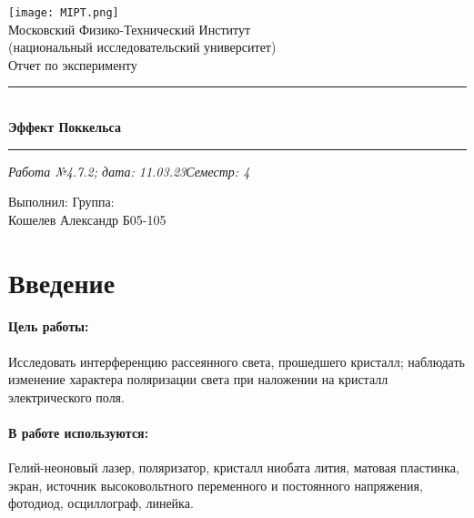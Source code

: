 \documentclass[12pt,a4paper]{article}
\begin{document}
	\begin{titlepage}
		\vspace*{\fill}
		
		\begin{center}
			\texttt{[image: MIPT.png]}
			\\[0.7cm]\Huge Московский Физико-Технический Институт\\(национальный исследовательский университет)
			\\[2cm]\LARGE Отчет по эксперименту
			\\[0.5cm]\noindent\rule{\textwidth}{1pt}
			\\\Huge\textbf{Эффект Поккельса}
			\\[-0.5cm]\noindent\rule{\textwidth}{1pt}
		\end{center}
		
		\begin{flushleft}
			\textit{Работа №4.7.2; дата: 11.03.23}\hfill\textit{Семестр: 4}
		\end{flushleft}
		
		\vspace*{\fill}
		
		\begin{flushleft}
			Выполнил: \hspace{\fill} Группа:
			\\Кошелев Александр \hspace{\fill} Б05-105
		\end{flushleft}
	\end{titlepage}

	\setcounter{page}{2}

	\section{Введение}
	
	\paragraph*{Цель работы:} \hfill
	
	Исследовать интерференцию рассеянного света, прошедшего кристалл; наблюдать изменение характера поляризации света при наложении на кристалл электрического поля.
	
	\paragraph*{В работе используются:} \hfill
	
	Гелий-неоновый лазер, поляризатор, кристалл ниобата лития, матовая пластинка, экран, источник высоковольтного переменного и постоянного напряжения, фотодиод, осциллограф, линейка.
	
\end{document}
